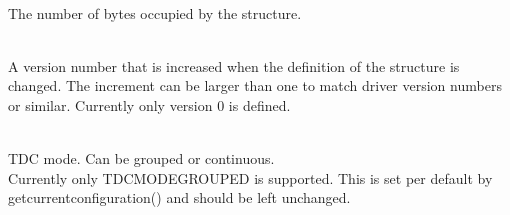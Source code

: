 			\\
			The number of bytes occupied by the structure.\par

			\\
			A version number that is increased when the definition of the structure is changed. The increment can be larger than one to match driver version numbers or similar. Currently only version 0 is defined.\par

			\\
			TDC mode. Can be grouped or continuous. \\
			Currently only \PREFIX TDC\tu MODE\tu GROUPED is supported. 
			This is set per default by \textsf{\prefix get\tu current\tu configuration()} and should be left unchanged.\par

			\par

